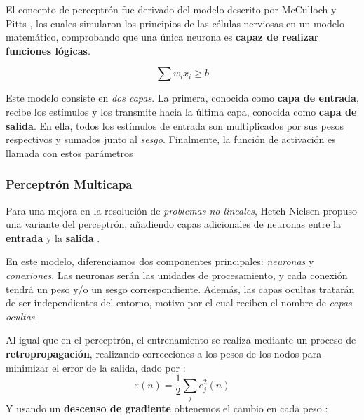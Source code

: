 El concepto de perceptrón fue derivado del modelo descrito por McCulloch y Pitts \cite{McCulloh1943ANets}, los cuales simularon los principios de las células nerviosas en un modelo matemático, comprobando que una única neurona es \textbf{capaz de realizar funciones lógicas}.

\begin{equation}
\sum w_{i}x_{i} \ge b
\end{equation}

Este modelo consiste en \textit{dos capas}. La primera, conocida como \textbf{capa de entrada}, recibe los estímulos y los transmite hacia la última capa, conocida como \textbf{capa de salida}. En ella, todos los estímulos de entrada son multiplicados por sus pesos respectivos y sumados junto al \textit{sesgo}. Finalmente, la función de activación es llamada con estos parámetros 


\subsubsection{Perceptrón Multicapa}

Para una mejora en la resolución de \textit{problemas no lineales}, Hetch-Nielsen propuso una variante del perceptrón, añadiendo capas adicionales de neuronas entre la \textbf{entrada} y la \textbf{salida} \cite{Hecht-Nielsen1989Neurocomputing}.


En este modelo, diferenciamos dos componentes principales: \textit{neuronas} y \textit{conexiones}. Las neuronas serán las unidades de procesamiento, y cada conexión tendrá un peso y/o un sesgo correspondiente. Además, las capas ocultas tratarán de ser independientes del entorno, motivo por el cual reciben el nombre de \textit{capas ocultas}.

Al igual que en el perceptrón, el entrenamiento se realiza mediante un proceso de \textbf{retropropagación}, realizando correcciones a los pesos de los nodos para minimizar el error de la salida, dado por \cite{Haykin1998NeuralFoundation}:
\begin{equation}
    \varepsilon (n) = \frac{1}{2}\sum_{j}e_{j}^2(n)
\end{equation}
Y usando un \textbf{descenso de gradiente} obtenemos el cambio en cada peso \cite{Haykin1998NeuralFoundation}:


